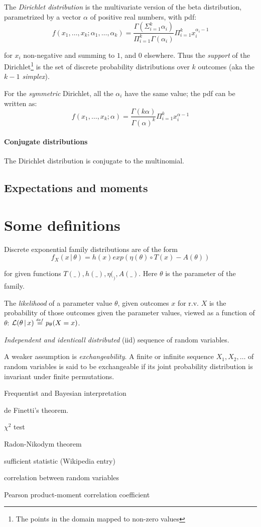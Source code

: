 \documentclass{article}
\newcommand{\alt}{\,|\,}
\newcommand{\defeq}{\stackrel{{\scriptscriptstyle def}}{=}}
\theoremstyle{definition}
\begin{document}
The {\em Dirichlet distribution} is the multivariate version of the beta distribution, parametrized by a vector \(\alpha\) of positive real numbers, with pdf:
\[f(x_1, \ldots, x_k; \alpha_1, \ldots, \alpha_k)
  = \frac{\Gamma(\Sigma_{i=1}^k \alpha_i)}{\Pi_{i=1}^k \Gamma(\alpha_i)} \Pi_{i=1}^k x_i^{\alpha_i -1}\]

for \(x_i\) non-negative and summing to \(1\), and \(0\) elsewhere. Thus the {\em support} of the Dirichlet\footnote{The points in the domain mapped to non-zero values} is the set of discrete probability distributions over \(k\) outcomes (aka the {\em \(k-1\) simplex}).

For the {\em symmetric} Dirichlet, all the \(\alpha_i\) have the same value; the pdf can be written as:
\[f(x_1, \ldots, x_k; \alpha) = \frac{\Gamma(k\alpha)}{\Gamma(\alpha)^k} \Pi_{i=1}^k x_i^{\alpha -1}\]

\paragraph{Conjugate distributions}

The Dirichlet distribution is conjugate to the multinomial.

\subsection{Expectations and moments}




\appendix

\section{Some definitions}

Discrete exponential family distributions are of the form
\[f_X(x \alt \theta) = h(x) exp(\eta(\theta) \circ T(x) - A(\theta))\]

\noindent for given functions \(T(\_), h(\_), \eta(_), A(\_)\). Here \(\theta\) is the parameter of the family.

The {\em likelihood} of a parameter value \(\theta\), given outcomes \(x\) for r.v. \(X\) is the probability of those outcomes given the parameter values, viewed as a function of \(\theta\):
\({\cal L}(\theta \alt x) \defeq p_{\theta}(X=x)\). 

{\em Independent and identicall distributed} (iid) sequence of random variables.

A weaker assumption is {\em exchangeability}. A finite or infinite sequence \(X_1, X_2, \ldots\) of random variables is said to be exchangeable if its joint probability distribution is invariant under finite permutations.

Frequentist and Bayesian interpretation

de Finetti's theorem.


\(\chi^2\) test

Radon-Nikodym theorem

sufficient statistic (Wikipedia entry)


correlation between random variables

Pearson product-moment correlation coefficient
\end{document}
